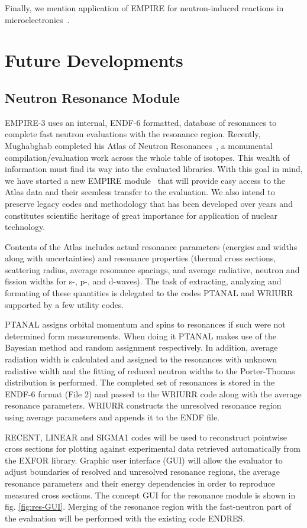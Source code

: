 \documentclass[twocolumn,amsmath,amssymb,10pt,groupedaddress,a4paper]{revtex4}
\begin{document}
Finally, we mention application of EMPIRE  for neutron-induced reactions in microelectronics~\cite{wrobel2005unc}.



\section{Future Developments}

\subsection{Neutron Resonance Module}
EMPIRE-3 uses an internal, ENDF-6 formatted, database of resonances to complete fast neutron evaluations with the resonance region. Recently,  Mughabghab completed his Atlas of Neutron Resonances~\cite{Mughabghab:06}, a monumental compilation/evaluation work across the whole table of isotopes. This wealth of information must find its way into the evaluated libraries. With this goal in mind, we have started a new EMPIRE module~\cite{Cho:07} that will provide easy access to the Atlas data and their seemless transfer to the evaluation. We also intend to preserve legacy codes and methodology that has been developed over years and constitutes scientific heritage of great importance for application of nuclear technology.

Contents of the Atlas includes actual resonance parameters (energies and widths along with uncertainties) and resonance properties  (thermal cross sections, scattering radius, average resonance spacings, and average radiative, neutron and fission widths for s-, p-, and d-waves). The task of extracting, analyzing and formating of these quantities is delegated to the codes PTANAL and WRIURR~\cite{Oh:00} supported by a few utility codes.

PTANAL assigns orbital momentum and spins to resonances if such were not determined form measurements. When doing it PTANAL makes use of the Bayesian method and random assignment respectively. In addition, average radiation width is calculated and assigned to the resonances with unknown radiative width and the fitting of reduced neutron widths to the Porter-Thomas distribution is performed. The completed set of resonances is stored in the ENDF-6 format (File 2) and  passed to the WRIURR code along with the average resonance parameters. WRIURR constructs the unresolved resonance region using average parameters and appends it to the ENDF file.

RECENT, LINEAR and SIGMA1 codes will be used to reconstruct pointwise cross sections for plotting against experimental data retrieved automatically from the EXFOR library. Graphic user interface (GUI) will allow the evaluator to adjust boundaries of resolved and unresolved resonance regions, the average resonance parameters and their energy dependencies in order to reproduce measured cross sections. The concept GUI for the resonance module is shown in fig. \ref{fig:res-GUI}. Merging of the resonance region with the fast-neutron part of the evaluation will be performed with the existing code ENDRES.
\end{document}
